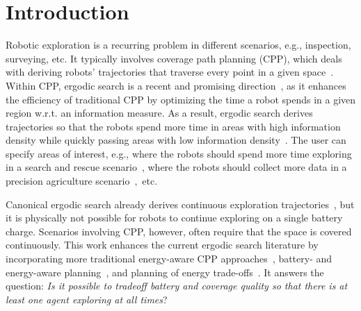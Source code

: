 \documentclass[letterpaper,10pt,conference,twoside]{IEEEtran}
\theoremstyle{definition}
\begin{document}
\vspace*{-.3cm}
\section{Introduction}
\noindent
Robotic exploration is a recurring problem in different scenarios, e.g., inspection, surveying, etc. It 
typically involves coverage path planning (CPP), which deals with deriving robots' trajectories that traverse every point in a given space~\cite{choset2001coverage,galceran2013survey,cabreira2019survey}. Within CPP, ergodic search is a recent and promising direction~\cite{abraham2021ergodic,miller2016ergodic,dressel2018optimality,torre2016ergodic,shetty2022ergodic,prabhakar2020ergodic,coffin2022multi,lerch2023safety,abraham2018decentralized,patel2021multi,dong2023time,abraham2017ergodic,rao2023multi,ayvali2017ergodic}, as it enhances the efficiency of traditional CPP by optimizing the time a robot spends in a given region w.r.t. an information measure. As a result, ergodic search derives trajectories so that the robots spend more time in areas with high information density while quickly passing areas with low information density~\cite{mathew2011metrics,%
patel2021multi}. The user can specify areas of interest, e.g., where the robots should spend more time exploring in a search and rescue scenario~\cite{dong2023time}, where the robots should collect more data in a precision agriculture scenario~\cite{rao2023multi},~etc.

Canonical ergodic search already derives continuous exploration trajectories~\cite{%
miller2013trajectory,miller2016ergodic,abraham2017ergodic}, but it is physically not possible for robots to continue exploring on a single battery charge. 
Scenarios involving CPP, however, often require that the space is covered continuously.
This work enhances the current ergodic search literature by incorporating more traditional energy-aware CPP approaches~\cite{difranco2015energy,difranco2016coverage,shnaps2016online,cabreira2018energy,wei2018coverage,jensen2021near}, battery- and energy-aware planning~\cite{mei2004energy,mei2005case,kim2005energy,seewald2022energy}, and planning of energy trade-offs~\cite{ondruska2015scheduled,sudhakar2020balancing}. It answers the question: \textit{Is it possible to tradeoff battery and coverage quality so that there is at least one agent exploring %
at all times}?
\end{document}
